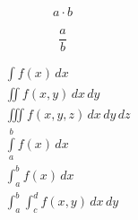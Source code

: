



%


\begin{equation*}
	a\cdot b
\end{equation*}

\begin{equation*}
	\frac{a}{b}
\end{equation*}

\begin{align*}
	&\int f(x)\,dx\\
        &\iint f(x,y)\,dx\,dy\\
        &\iiint f(x,y,z)\,dx\,dy\,dz\\
        &\int\limits_{a}^{b}f(x)\,dx\\
        &\int_{a}^{b}f(x)\,dx\\
        &\int_{a}^{b}\int_{c}^{d}f(x,y)\,dx\,dy
\end{align*}

